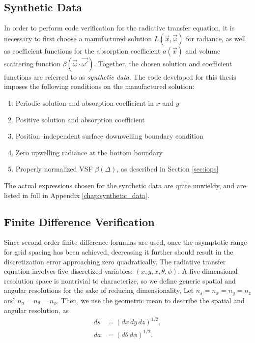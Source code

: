 \subsection{Synthetic Data}
\label{sec:synthetic_data}
In order to perform code verification for the radiative transfer equation, it is necessary to first choose a manufactured solution $L(\vec{x}, \vec{\omega})$ for radiance, as well as coefficient functions for the absorption coefficient $a(\vec{x})$ and volume scattering function $\beta(\vec{\omega}\cdot\vec{\omega'})$.
Together, the chosen solution and coefficient functions are referred to as \textit{synthetic data}.
The code developed for this thesis imposes the following conditions on the manufactured solution:
\begin{enumerate}
  \item Periodic solution and absorption coefficient in $x$ and $y$
  \item Positive solution and absorption coefficient
  \item Position--independent surface downwelling boundary condition
  \item Zero upwelling radiance at the bottom boundary
  \item Properly normalized VSF $\beta(\Delta)$, as described in Section \ref{sec:iops}
\end{enumerate}
The actual expressions chosen for the synthetic data are quite unwieldy, and are listed in full in Appendix \ref{chap:synthetic_data}.


\subsection{Finite Difference Verification}
Since second order finite difference formulas are used, once the asymptotic range for grid spacing has been achieved, decreasing it further should result in the discretization error approaching zero quadratically.
The radiative transfer equation involves five discretized variables: $(x,y,x,\theta,\phi)$.
A five dimensional resolution space is nontrivial to characterize, so we define generic spatial and angular resolutions for the sake of reducing dimensionality,
Let $n_s = n_x = n_y = n_z$ and $n_a = n_\theta = n_\phi$.
Then, we use the geometric mean to describe the spatial and angular resolution, as
\begin{align}
  ds &= (dx\, dy\, dz)^{1/3}, \label{eqn:ds}\\
  da &= (d\theta\, d\phi)^{1/2}.
  \label{eqn:da}
\end{align}

